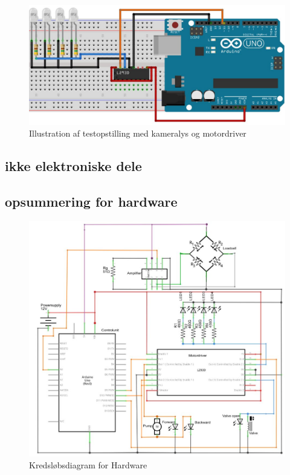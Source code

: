 \begin{figure}[H]
	\centering
	\includegraphics[width=1\textwidth]{billeder/Hardware/diagrammer/LEDbreadboard.JPG}
	\caption{Illustration af testopstilling med kameralys og motordriver}
	\label{fig:LEDbreadboard}
\end{figure}
 
 
 
 
\subsection{ikke elektroniske dele}
 
 
\subsection{opsummering for hardware} 

\begin{figure}[H]
	\centering
	\includegraphics[width=1\textwidth]{billeder/Hardware/diagrammer/HWdiagram.JPG}
	\caption{Kredsløbsdiagram for Hardware}
	\label{fig:HWdiagram}
\end{figure}
 